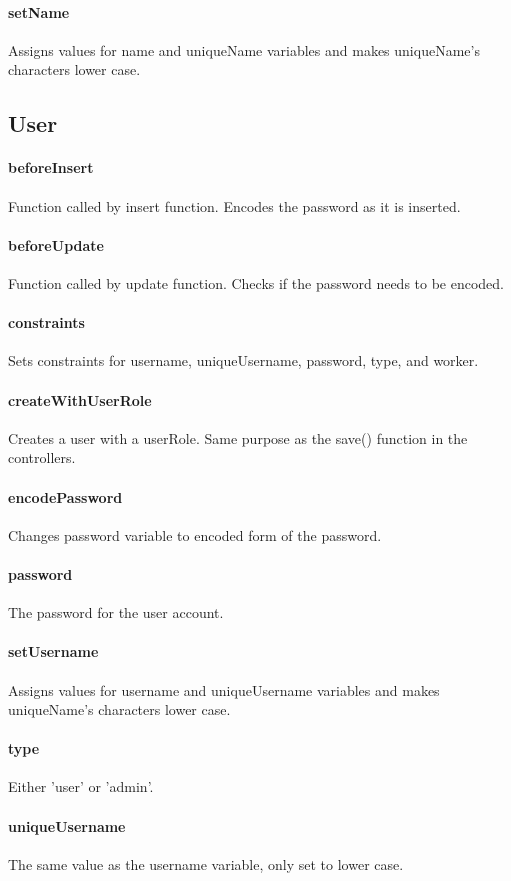 \documentclass[12pt]{article}
\begin{document}
\paragraph{setName} Assigns values for name and uniqueName variables and makes uniqueName's characters lower case.

\setcounter{paragraph}{0}
\subsection{User}\label{sec:DUser}
\paragraph{beforeInsert} Function called by insert function. Encodes the password as it is inserted.
\paragraph{beforeUpdate} Function called by update function. Checks if the password needs to be encoded.
\paragraph{constraints} Sets constraints for username, uniqueUsername, password, type, and worker.
\paragraph{createWithUserRole} Creates a user with a userRole. Same purpose as the save() function in the controllers.
\paragraph{encodePassword} Changes password variable to encoded form of the password.
\paragraph{password} The password for the user account.
\paragraph{setUsername} Assigns values for username and uniqueUsername variables and makes uniqueName's characters lower case.
\paragraph{type} Either 'user' or 'admin'.
\paragraph{uniqueUsername} The same value as the username variable, only set to lower case.
\end{document}
